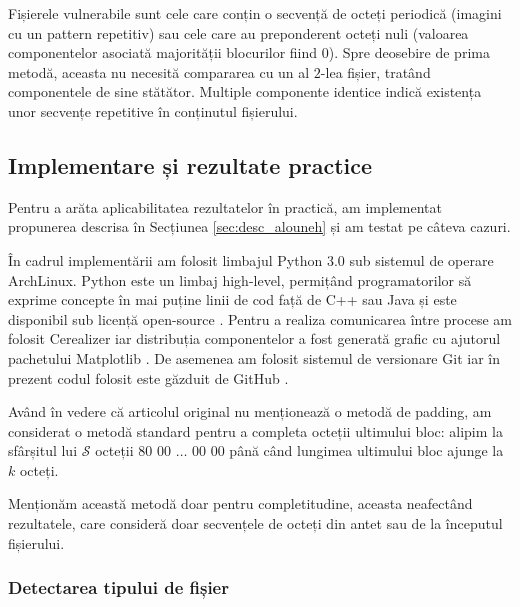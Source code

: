 \documentclass[oneside, 12pt]{book}
\begin{document}
Fișierele vulnerabile sunt cele care conțin o secvență de octeți periodică (imagini cu un pattern repetitiv) sau cele care au preponderent octeți nuli (valoarea componentelor asociată majorității blocurilor fiind $0$). Spre deosebire de prima metodă, aceasta nu necesită compararea cu un al $2$-lea fișier, tratând componentele de sine stătător. Multiple componente identice indică existența unor secvențe repetitive în conținutul fișierului.



\subsection{Implementare și rezultate practice}
Pentru a arăta aplicabilitatea rezultatelor în practică, am implementat propunerea descrisa în Secțiunea {\ref{sec:desc_alouneh}} și am testat pe câteva cazuri.

În cadrul implementării am folosit limbajul Python 3.0 sub sistemul de operare ArchLinux. Python este un limbaj high-level, permițând programatorilor să exprime concepte în mai puține linii de cod față de C++ sau Java și este disponibil sub licență open-source \cite{Python:2015}.
Pentru a realiza comunicarea între procese am folosit Cerealizer iar distribuția componentelor a fost generată grafic cu ajutorul pachetului Matplotlib \cite{Hunter:2007, PyCerealizer:2015}. De asemenea am folosit sistemul de versionare Git iar în prezent codul folosit este găzduit de GitHub \cite{Github:2015, CodeGit:2015}.

Având în vedere că articolul original nu menționează o metodă de padding, am considerat o metodă standard pentru a completa octeții ultimului bloc: alipim la sfârșitul lui $\mathcal{S}$ octeții $80$ $00$ $\dots$ $00$ $00$ până când lungimea ultimului bloc ajunge la $k$ octeți.

Menționăm această metodă doar pentru completitudine, aceasta neafectând rezultatele, care consideră doar secvențele de octeți din antet sau de la începutul fișierului.



\subsubsection{Detectarea tipului de fișier}\hspace*{\fill} \\
\end{document}
